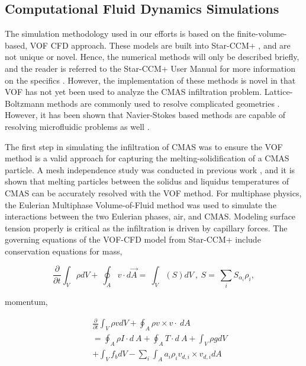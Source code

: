\documentclass[%
 aip,
 amsmath,amssymb,
 reprint,%
floatfix]{revtex4-1}
\begin{document}
\subsection{Computational Fluid Dynamics Simulations}
The simulation methodology used in our efforts\cite{Cavainolo2023, Cavainolo2022} is based on the finite-volume-based, VOF CFD approach. These models are built into Star-CCM+ \cite{starccm}, and are not unique or novel. Hence, the numerical methods will only be described briefly, and the reader is referred to the Star-CCM+ User Manual for more information on the specifics \cite{starccm}. However, the implementation of these methods is novel in that VOF has not yet been used to analyze the CMAS infiltration problem. Lattice-Boltzmann methods are commonly used to resolve complicated geometries \cite{Zhang2011}. However, it has been shown that Navier-Stokes based methods are capable of resolving microfluidic problems as well \cite{LeHenaff2022}.

The first step in simulating the infiltration of CMAS was to ensure the VOF method is a valid approach for capturing the melting-solidification of a CMAS particle. A mesh independence study was conducted in previous work \cite{Cavainolo2022}, and it is shown that melting particles between the solidus and liquidus temperatures of CMAS can be accurately resolved with the VOF method. For multiphase physics, the Eulerian Multiphase Volume-of-Fluid method was used to simulate the interactions between the two Eulerian phases, air, and CMAS.  Modeling surface tension properly is critical as the infiltration is driven by capillary forces. The governing equations of the VOF-CFD model from  Star-CCM+ \cite{starccm} include conservation equations for mass,

\begin{equation}
\label{consMass:equation}
    \frac{\partial}{\partial t}\int_{V}\rho dV+\ \oint_{A}{v\cdot d\Vec{A}}=\ \int_{V}\left(S\right)dV\ ,\ S=\ \sum_{i}{S_{\alpha_i}\rho_i},
\end{equation}

\noindent momentum,

\begin{eqnarray}
\label{consMomentum:equation}
    &&\frac{\partial}{\partial t}\int_{V}\rho vdV+\oint_{A}{\rho v\times v}\cdot\ dA \nonumber\\
    &&=\oint_{A}{\rho I\cdot d\ A}+\oint_{A}{T\cdot d\ A}+\int_{V}\rho gdV\ \\
    &&+\int_{V}{f_bdV}-\sum_{i}\int_{A}{a_i\rho_iv_{d,i}\times v_{d,i}dA}\nonumber
\end{eqnarray}
\end{document}

